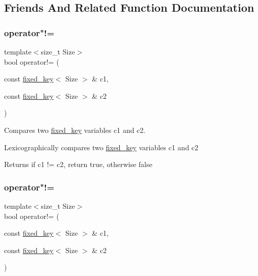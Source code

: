 \subsection{Friends And Related Function Documentation}
\mbox{\label{classaacio_1_1fixed__key_ac19901f66d7942ad087edef0daef485d}} 
\subsubsection{\texorpdfstring{operator"!=}{operator!=}\hspace{0.1cm}{\footnotesize\ttfamily [1/2]}}
{\footnotesize\ttfamily template$<$size\+\_\+t Size$>$ \\
bool operator!= (\begin{DoxyParamCaption}\item[{const \mbox{\hyperlink{classaacio_1_1fixed__key}{fixed\+\_\+key}}$<$ Size $>$ \&}]{c1,  }\item[{const \mbox{\hyperlink{classaacio_1_1fixed__key}{fixed\+\_\+key}}$<$ Size $>$ \&}]{c2 }\end{DoxyParamCaption})\hspace{0.3cm}{\ttfamily [friend]}}



Compares two \mbox{\hyperlink{classaacio_1_1fixed__key}{fixed\+\_\+key}} variables c1 and c2. 

Lexicographically compares two \mbox{\hyperlink{classaacio_1_1fixed__key}{fixed\+\_\+key}} variables c1 and c2 \begin{DoxyReturn}{Returns}
if c1 != c2, return true, otherwise false 
\end{DoxyReturn}
\mbox{\label{classaacio_1_1fixed__key_ac19901f66d7942ad087edef0daef485d}} 
\subsubsection{\texorpdfstring{operator"!=}{operator!=}\hspace{0.1cm}{\footnotesize\ttfamily [2/2]}}
{\footnotesize\ttfamily template$<$size\+\_\+t Size$>$ \\
bool operator!= (\begin{DoxyParamCaption}\item[{const \mbox{\hyperlink{classaacio_1_1fixed__key}{fixed\+\_\+key}}$<$ Size $>$ \&}]{c1,  }\item[{const \mbox{\hyperlink{classaacio_1_1fixed__key}{fixed\+\_\+key}}$<$ Size $>$ \&}]{c2 }\end{DoxyParamCaption})\hspace{0.3cm}{\ttfamily [friend]}}



